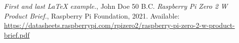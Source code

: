 \begin{thebibliography}{9}
   \emph{First and last \LaTeX{} example.},
  John Doe 50 B.C. 
   \emph{Raspberry Pi Zero 2 W Product Brief.},
  Raspberry Pi Foundation, 2021. Available: \url{https://datasheets.raspberrypi.com/rpizero2/raspberry-pi-zero-2-w-product-brief.pdf}
\end{thebibliography}